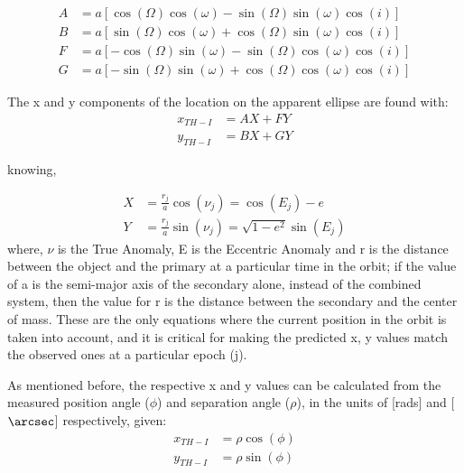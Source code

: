 \documentclass[12pt,preprint]{aastex}
\begin{document}
\begin{subequations}
\begin{align}\label{eq:24a}
A& = a[\cos(\Omega)\cos(\omega)-\sin(\Omega)\sin(\omega)\cos(i)]\\
\label{eq:24b}
B& = a[\sin(\Omega)\cos(\omega)+\cos(\Omega)\sin(\omega)\cos(i)]\\
\label{eq:24c}
F& = a[-\cos(\Omega)\sin(\omega)-\sin(\Omega)\cos(\omega)\cos(i)]\\
\label{eq:24d}
G& = a[-\sin(\Omega)\sin(\omega)+\cos(\Omega)\cos(\omega)\cos(i)]
\end{align}
\end{subequations}

The x and y components of the location on the apparent ellipse are found with:
\begin{subequations}
\begin{align}\label{eq:28-1a}
x_{TH-I}& = AX+FY\\
\label{eq:28-1b}
y_{TH-I}& = BX + GY
\end{align}
\end{subequations}

knowing,

\begin{subequations}
\begin{align}\label{eq:28-1.5a}
X& = \frac{r_j}{a}\cos(\nu_j) =\cos(E_j)-e\\
\label{eq:28-1.5b}
Y& = \frac{r_j}{a}\sin(\nu_j) = \sqrt{1-e^2}\sin(E_j) 
\end{align}
\end{subequations}
where, $\nu$ is the True Anomaly, E is the Eccentric Anomaly and r is the distance between the object and the primary at a particular time in the orbit; if the value of a is the semi-major axis of the secondary alone, instead of the combined system, then the value for r is the distance between the secondary and the center of mass.  These are the only equations where the current position in the orbit is taken into account, and it is critical for making the predicted x, y values match the observed ones at a particular epoch (j).


As mentioned before, the respective x and y values can be calculated from the measured position angle ($\phi$) and separation angle ($\rho$), in the units of [rads] and [$\arcsec$] respectively, given:
\begin{subequations}
\begin{align}\label{eq:28-2a}
x_{TH-I}& = \rho \cos(\phi)\\
\label{eq:28-2b}
y_{TH-I}& = \rho \sin(\phi)
\end{align}
\end{subequations}
\pagebreak
\end{document}
